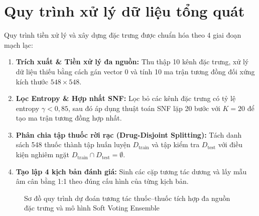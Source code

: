 \documentclass[12pt,a4paper,oneside]{report}
\begin{document}
\section{Quy trình xử lý dữ liệu tổng quát}
Quy trình tiền xử lý và xây dựng đặc trưng được chuẩn hóa theo 4 giai đoạn mạch lạc:
\begin{enumerate}
  \item \textbf{Trích xuất \& Tiền xử lý đa nguồn:} Thu thập 10 kênh đặc trưng, xử lý dữ liệu thiếu bằng cách gán vector 0 và tính 10 ma trận tương đồng đối xứng kích thước $548 \times 548$.
  \item \textbf{Lọc Entropy \& Hợp nhất SNF:} Lọc bỏ các kênh đặc trưng có tỷ lệ entropy $\gamma < 0{,}85$, sau đó áp dụng thuật toán SNF lặp 20 bước với $K=20$ để tạo ma trận tương đồng hợp nhất.
  \item \textbf{Phân chia tập thuốc rời rạc (Drug-Disjoint Splitting):} Tách danh sách 548 thuốc thành tập huấn luyện $D_{\text{train}}$ và tập kiểm tra $D_{\text{test}}$ với điều kiện nghiêm ngặt $D_{\text{train}} \cap D_{\text{test}} = \emptyset$.
  \item \textbf{Tạo lập 4 kịch bản đánh giá:} Sinh các cặp tương tác dương và lấy mẫu âm cân bằng 1:1 theo đúng cấu hình của từng kịch bản.
\end{enumerate}

\begin{figure}[H]
  \centering
  \caption{Sơ đồ quy trình dự đoán tương tác thuốc--thuốc tích hợp đa nguồn đặc trưng và mô hình Soft Voting Ensemble}
  \label{fig:pipeline_overview}
\end{figure}
\end{document}
